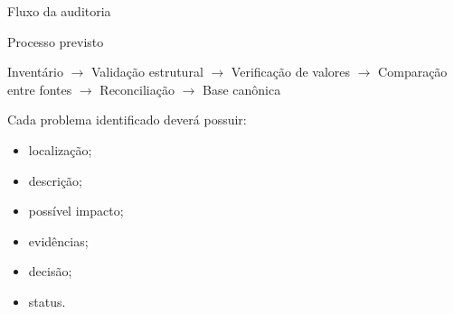 
\begin{frame}{Fluxo da auditoria}

    \begin{block}{Processo previsto}
        \centering

        Inventário
        $\rightarrow$
        Validação estrutural
        $\rightarrow$
        Verificação de valores
        $\rightarrow$
        Comparação entre fontes
        $\rightarrow$
        Reconciliação
        $\rightarrow$
        Base canônica
    \end{block}

    \vspace{0.4cm}

    Cada problema identificado deverá possuir:

    \begin{itemize}
        \item localização;
        \item descrição;
        \item possível impacto;
        \item evidências;
        \item decisão;
        \item status.
    \end{itemize}

\end{frame}



